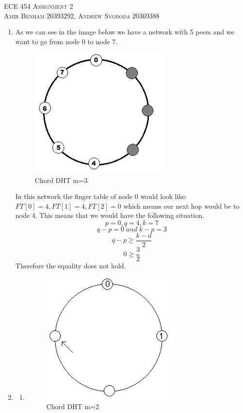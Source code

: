 \documentclass{article}
\begin{document}
\begin{center}
\textsc{\Large ECE 454 Assignment 2}\\[0.5cm]
\textsc{Amir Benham 20393292, Andrew Svoboda 20369388}\\[0.5cm]
\end{center}

\begin{enumerate}

	\item As we can see in the image below we have a network with 5 peers and we want to go from node 0 to node 7.
		
\begin{figure}[ht!]
\centering
\includegraphics[width=70mm]{q1.png}
\caption{Chord DHT m=3}
\label{overflow}
\end{figure}
	
	In this network the finger table of node 0 would look like: \(FT[0]=4, FT[1]=4, FT[2]=0\) which means our next hop would be to node 4. This means that we would have the following situation.
\[
p=0, q=4 , k=7
\]
\[
q-p=0 \; and\;  k-p=3
\]
\[
q-p \ge \frac{k-d}{2}
\]
\[
0\ge \frac{3}{2}
\]
Therefore the equality does not hold.

\item
 \begin{enumerate}
	\item 

\begin{figure}[ht!]
\centering
\includegraphics[width=70mm]{q2a_m2.png}
\caption{Chord DHT m=2}


\end{figure}
\end{enumerate}
\end{enumerate}
\end{document}
